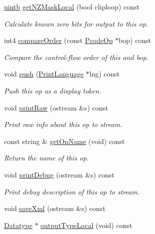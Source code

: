 \begin{DoxyCompactItemize}
\mbox{\hyperlink{types_8h_a2db313c5d32a12b01d26ac9b3bca178f}{uintb}} \mbox{\hyperlink{class_pcode_op_a7c598d70b51160ff643b92a1619e1929}{get\+N\+Z\+Mask\+Local}} (bool cliploop) const
\begin{DoxyCompactList}\small\item\em Calculate known zero bits for output to this op. \end{DoxyCompactList}\item 
int4 \mbox{\hyperlink{class_pcode_op_a9a58052af8c0272d059c44fa4172c18a}{compare\+Order}} (const \mbox{\hyperlink{class_pcode_op}{Pcode\+Op}} $\ast$bop) const
\begin{DoxyCompactList}\small\item\em Compare the control-\/flow order of this and {\itshape bop}. \end{DoxyCompactList}\item 
void \mbox{\hyperlink{class_pcode_op_a8f2fa24d19c6744948804eb75388deb9}{push}} (\mbox{\hyperlink{class_print_language}{Print\+Language}} $\ast$lng) const
\begin{DoxyCompactList}\small\item\em Push this op as a display token. \end{DoxyCompactList}\item 
void \mbox{\hyperlink{class_pcode_op_ac0876c5f6b45db26101ff7ea1636e28f}{print\+Raw}} (ostream \&s) const
\begin{DoxyCompactList}\small\item\em Print raw info about this op to stream. \end{DoxyCompactList}\item 
const string \& \mbox{\hyperlink{class_pcode_op_a48b3ad5fe1afa59cee1be17d1ef5875f}{get\+Op\+Name}} (void) const
\begin{DoxyCompactList}\small\item\em Return the name of this op. \end{DoxyCompactList}\item 
void \mbox{\hyperlink{class_pcode_op_ad69a4ae6a740167e608f39ebc2b716df}{print\+Debug}} (ostream \&s) const
\begin{DoxyCompactList}\small\item\em Print debug description of this op to stream. \end{DoxyCompactList}\item 
void \mbox{\hyperlink{class_pcode_op_a4fc0474bc30c981150acade20eaa1262}{save\+Xml}} (ostream \&s) const
\item 
\mbox{\hyperlink{class_datatype}{Datatype}} $\ast$ \mbox{\hyperlink{class_pcode_op_ad27780592d3dac5267551aa7f02c5bb7}{output\+Type\+Local}} (void) const

\end{DoxyCompactItemize}
